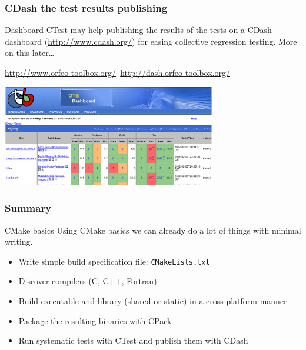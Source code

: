 \documentclass[compress,slidestop,table,usepdftitle=false
              ]
               {beamer}
\newcommand{\fname}[1]{\texttt{#1}}
\begin{document}
\begin{frame}[fragile]
\frametitle{CDash the test results publishing}
\begin{block}{Dashboard}
CTest may help publishing the results of the tests
on a CDash dashboard (\url{http://www.cdash.org/}) 
for easing collective regression testing.
More on this later\ldots
\end{block}
\begin{center}
{\scriptsize
\url{http://www.orfeo-toolbox.org/}--\url{http://dash.orfeo-toolbox.org/}
}

\includegraphics[width=0.7\textwidth]{OrfeoToolboxDashBoard}
\end{center}
\end{frame}


\begin{frame}[fragile]
\frametitle{Summary}
\begin{block}{CMake basics}
Using CMake basics we can already do a lot of things with minimal writing.
\end{block}
\begin{itemize}
\item Write simple build specification file: \fname{CMakeLists.txt}
\item Discover compilers (C, C++, Fortran)
\item Build executable and library (shared or static) in a cross-platform manner
\item Package the resulting binaries with CPack
\item Run systematic tests with CTest and publish them with CDash
\end{itemize}
\end{frame}
\end{document}
